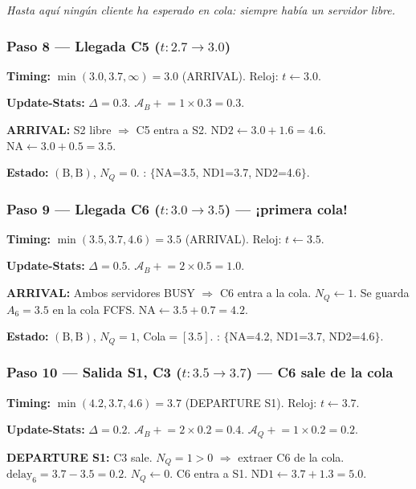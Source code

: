 \documentclass[11pt, letterpaper]{article}
\begin{document}
\emph{Hasta aquí ningún cliente ha esperado en cola: siempre había un servidor libre.}

\subsubsection*{Paso 8 --- Llegada C5 ($t: 2.7 \to 3.0$)}

\textbf{Timing:} $\min(3.0, 3.7, \infty) = 3.0$ (ARRIVAL). Reloj: $t \leftarrow 3.0$.

\textbf{Update-Stats:} $\Delta = 0.3$. $\mathcal{A}_B \mathrel{+}= 1 \times 0.3 = 0.3$.

\textbf{ARRIVAL:} S2 libre $\Rightarrow$ C5 entra a S2. $\text{ND2} \leftarrow 3.0 + 1.6 = 4.6$. $\text{NA} \leftarrow 3.0 + 0.5 = 3.5$.

\textbf{Estado:} $(\text{B}, \text{B})$, $N_Q = 0$. \quad \FEL: $\{$NA=3.5, ND1=3.7, ND2=4.6$\}$.

\subsubsection*{Paso 9 --- Llegada C6 ($t: 3.0 \to 3.5$) --- \textcolor{rojoclaro}{¡primera cola!}}

\textbf{Timing:} $\min(3.5, 3.7, 4.6) = 3.5$ (ARRIVAL). Reloj: $t \leftarrow 3.5$.

\textbf{Update-Stats:} $\Delta = 0.5$. $\mathcal{A}_B \mathrel{+}= 2 \times 0.5 = 1.0$.

\textbf{ARRIVAL:} Ambos servidores BUSY $\Rightarrow$ \textcolor{rojoclaro}{C6 entra a la cola}. $N_Q \leftarrow 1$. Se guarda $A_6 = 3.5$ en la cola FCFS. $\text{NA} \leftarrow 3.5 + 0.7 = 4.2$.

\textbf{Estado:} $(\text{B}, \text{B})$, $N_Q = 1$, Cola$= [3.5]$. \quad \FEL: $\{$NA=4.2, ND1=3.7, ND2=4.6$\}$.

\subsubsection*{Paso 10 --- Salida S1, C3 ($t: 3.5 \to 3.7$) --- C6 sale de la cola}

\textbf{Timing:} $\min(4.2, 3.7, 4.6) = 3.7$ (DEPARTURE S1). Reloj: $t \leftarrow 3.7$.

\textbf{Update-Stats:} $\Delta = 0.2$. $\mathcal{A}_B \mathrel{+}= 2 \times 0.2 = 0.4$. $\mathcal{A}_Q \mathrel{+}= 1 \times 0.2 = 0.2$.

\textbf{DEPARTURE S1:} C3 sale. $N_Q = 1 > 0$ $\Rightarrow$ extraer C6 de la cola. $\text{delay}_6 = 3.7 - 3.5 = 0.2$. $N_Q \leftarrow 0$. C6 entra a S1. $\text{ND1} \leftarrow 3.7 + 1.3 = 5.0$.
\end{document}
